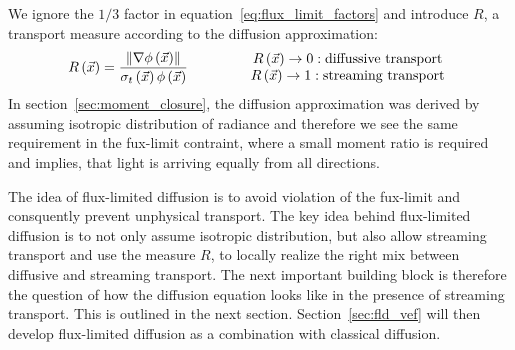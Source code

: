 We ignore the $1/3$ factor in equation~\ref{eq:flux_limit_factors} and introduce $R$, a transport measure according to the diffusion approximation:
\begin{align}
\label{eq:fld_transport_measure_R}
R\left(\vec{x}\right)
= 
\frac{\left\lVert\nabla\phi\left(\vec{x}\right)\right\rVert}{\sigma_t\left(\vec{x}\right)\phi\left(\vec{x}\right)}
\qquad
\qquad
\begin{array}{cc}
R\left(\vec{x}\right)\rightarrow 0 : \text{diffussive transport}\\
R\left(\vec{x}\right)\rightarrow 1 : \text{streaming transport}
\end{array}
\end{align}
In section~\ref{sec:moment_closure}, the diffusion approximation was derived by assuming isotropic distribution of radiance and therefore we see the same requirement in the fux-limit contraint, where a small moment ratio is required and implies, that light is arriving equally from all directions.

The idea of flux-limited diffusion is to avoid violation of the fux-limit and consquently prevent unphysical transport. The key idea behind flux-limited diffusion is to not only assume isotropic distribution, but also allow streaming transport and use the measure $R$, to locally realize the right mix between diffusive and streaming transport. The next important building block is therefore the question of how the diffusion equation looks like in the presence of streaming transport. This is outlined in the next section. Section~\ref{sec:fld_vef} will then develop flux-limited diffusion as a combination with classical diffusion.
